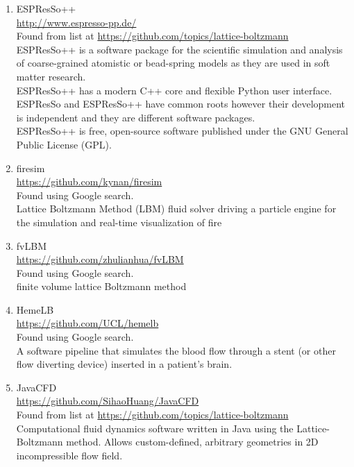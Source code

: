 \documentclass{article}
\begin{document}
\begin{enumerate}
	\item ESPResSo++
\\
	\href{http://www.espresso-pp.de/}{http://www.espresso-pp.de/}
\\
			Found from list at \href{https://github.com/topics/lattice-boltzmann}{https://github.com/topics/lattice-boltzmann}\\
	ESPResSo++ is a software package for the scientific simulation and analysis of coarse-grained atomistic or bead-spring models as they are used in soft matter research.\\
	ESPResSo++ has a modern C++ core and flexible Python user interface.\\
	ESPResSo and ESPResSo++ have common roots however their development is independent and they are different software packages.\\
	ESPResSo++ is free, open-source software published under the GNU General Public License (GPL).
	
	\item firesim \\ 
	\href{https://github.com/kynan/firesim}{https://github.com/kynan/firesim}
\\
	Found using Google search.\\
	Lattice Boltzmann Method (LBM) fluid solver driving a particle engine for the simulation and real-time visualization of fire
	
	\item fvLBM
\\
	\href{https://github.com/zhulianhua/fvLBM}{https://github.com/zhulianhua/fvLBM}
\\
	Found using Google search.\\
	finite volume lattice Boltzmann method
	
	\item HemeLB \\
	\href{https://github.com/UCL/hemelb}{https://github.com/UCL/hemelb}
\\
	Found using Google search.\\
	A software pipeline that simulates the blood flow through a stent (or other flow diverting device) inserted in a patient’s brain.
	
	\item JavaCFD
\\
	\href{https://github.com/SihaoHuang/JavaCFD}{https://github.com/SihaoHuang/JavaCFD}
\\
		Found from list at \href{https://github.com/topics/lattice-boltzmann}{https://github.com/topics/lattice-boltzmann}\\
	Computational fluid dynamics software written in Java using the Lattice-Boltzmann method. Allows custom-defined, arbitrary geometries in 2D incompressible flow field.
	

\end{enumerate}
\end{document}
